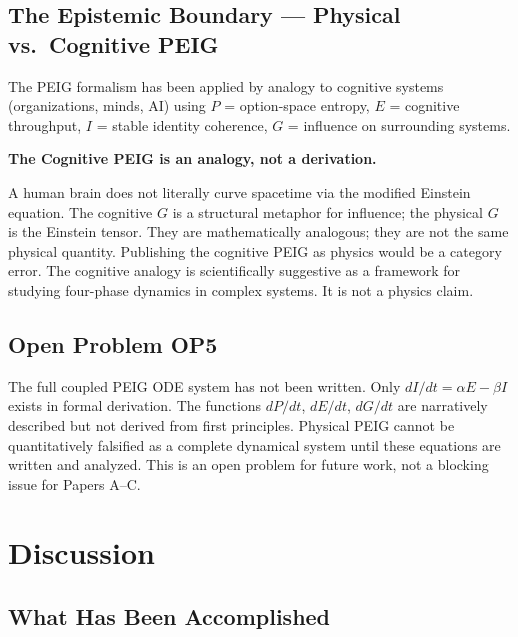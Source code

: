 \documentclass[12pt,letterpaper]{article}
\theoremstyle{plain}
\theoremstyle{definition}
\theoremstyle{remark}
\begin{document}
\subsection{The Epistemic Boundary --- Physical vs.\ Cognitive PEIG}

The PEIG formalism has been applied by analogy to cognitive systems
(organizations, minds, AI) using $P$ = option-space entropy, $E$ =
cognitive throughput, $I$ = stable identity coherence, $G$ = influence
on surrounding systems.

\begin{corestatement}
\textbf{The Cognitive PEIG is an analogy, not a derivation.}

A human brain does not literally curve spacetime via the modified
Einstein equation. The cognitive $G$ is a structural metaphor for
influence; the physical $G$ is the Einstein tensor. They are
mathematically analogous; they are not the same physical quantity.
Publishing the cognitive PEIG as physics would be a category error.
The cognitive analogy is scientifically suggestive as a framework for
studying four-phase dynamics in complex systems. It is not a physics claim.
\end{corestatement}

\subsection{Open Problem OP5}

The full coupled PEIG ODE system has not been written. Only
$dI/dt = \alpha E - \beta I$ exists in formal derivation. The functions
$dP/dt$, $dE/dt$, $dG/dt$ are narratively described but not derived from
first principles. Physical PEIG cannot be quantitatively falsified as a
complete dynamical system until these equations are written and analyzed.
This is an open problem for future work, not a blocking issue for Papers A--C.

\newpage
\section{Discussion}
\label{sec:discussion}

\subsection{What Has Been Accomplished}
\end{document}

